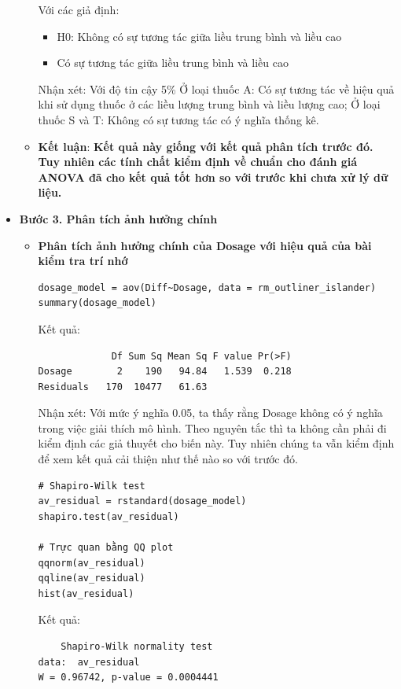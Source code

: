 \begin{itemize}
\begin{itemize}
    Với các giả định:
        \begin{itemize}
            \item H0: Không có sự tương tác giữa liều trung bình và liều cao
            \item Có sự tương tác giữa liều trung bình và liều cao
        \end{itemize}
    Nhận xét: Với độ tin cậy 5\% Ở loại thuốc A: Có sự tương tác về hiệu quả khi sử dụng thuốc ở các liều lượng trung bình và liều lượng cao; Ở loại thuốc S và T: Không có sự tương tác có ý nghĩa thống kê.
    
    \item \textbf{Kết luận}: \textbf{Kết quả này giống với kết quả phân tích trước đó. Tuy nhiên các tính chất kiểm định về chuẩn cho đánh giá ANOVA đã cho kết quả tốt hơn so với trước khi chưa xử lý dữ liệu.}
    \end{itemize}
   \item \textbf{Bước 3. Phân tích ảnh hưởng chính}
   \begin{itemize}
       \item \textbf{Phân tích ảnh hưởng chính của Dosage với hiệu quả của bài kiểm tra trí nhớ}
       \begin{lstlisting}
dosage_model = aov(Diff~Dosage, data = rm_outliner_islander)
summary(dosage_model)
       \end{lstlisting}
       Kết quả:
       \begin{lstlisting}
             Df Sum Sq Mean Sq F value Pr(>F)
Dosage        2    190   94.84   1.539  0.218
Residuals   170  10477   61.63               
       \end{lstlisting}
    Nhận xét: Với mức ý nghĩa 0.05, ta thấy rằng Dosage không có ý nghĩa trong việc giải thích mô hình. Theo nguyên tắc thì ta không cần phải đi kiểm định các giả thuyết cho biến này. Tuy nhiên chúng ta vẫn kiểm định để xem kết quả cải thiện như thế nào so với trước đó.
    \begin{lstlisting}
# Shapiro-Wilk test
av_residual = rstandard(dosage_model)
shapiro.test(av_residual)

# Trực quan bằng QQ plot
qqnorm(av_residual)
qqline(av_residual)
hist(av_residual)
    \end{lstlisting}
    Kết quả:
    \begin{lstlisting}
	Shapiro-Wilk normality test
data:  av_residual
W = 0.96742, p-value = 0.0004441
    \end{lstlisting}


\end{itemize}
\end{itemize}
